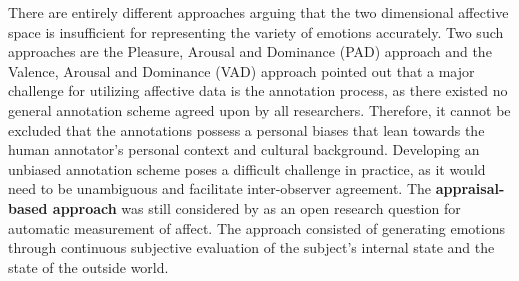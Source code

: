 \newline\newline
There are entirely different approaches arguing that the two dimensional affective space is insufficient for representing the variety of emotions accurately. Two such approaches are the Pleasure, Arousal and Dominance (PAD) approach \citep{Gunes:2011:EmotionRepresentationContinuous} and the Valence, Arousal and Dominance (VAD) approach \citep{Verma:2017:3D-VAD}
\newline\newline
\citet{Gunes:2011:EmotionRepresentationContinuous} pointed out that a major challenge for utilizing affective data is the annotation process, as there existed no general annotation scheme agreed upon by all researchers. Therefore, it cannot be excluded that the annotations possess a personal biases that lean towards the human annotator's personal context and cultural background. Developing an unbiased annotation scheme poses a difficult challenge in practice, as it would need to be unambiguous and facilitate inter-observer agreement.
\newline\newline
The \textbf{appraisal-based approach} was still considered by \citet{Gunes:2011:EmotionRepresentationContinuous} as an open research question for automatic measurement of affect. The approach consisted of generating emotions through continuous subjective evaluation of the subject's internal state and the state of the outside world.


